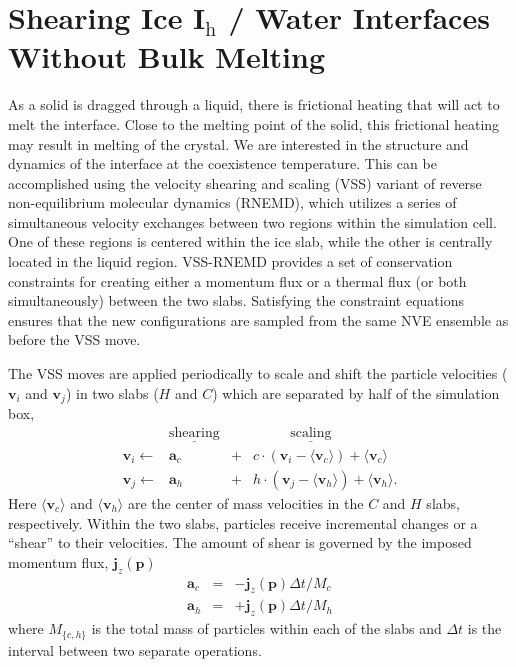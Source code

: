 \section{Shearing Ice I$_\mathrm{h}$ / Water Interfaces Without Bulk Melting}

As a solid is dragged through a liquid, there is frictional heating
that will act to melt the interface.  Close to the melting point of the
solid, this frictional heating may result in melting of the crystal.
We are interested in the structure and dynamics of the interface at
the coexistence temperature.  This can be accomplished using the velocity
shearing and scaling (VSS) variant of reverse non-equilibrium
molecular dynamics (RNEMD), which utilizes a series of simultaneous
velocity exchanges between two regions within the simulation
cell.\cite{Kuang2012} One of these regions is centered within the ice
slab, while the other is centrally located in the liquid
region. VSS-RNEMD provides a set of conservation constraints for
creating either a momentum flux or a thermal flux (or both
simultaneously) between the two slabs.  Satisfying the constraint
equations ensures that the new configurations are sampled from the
same NVE ensemble as before the VSS move.

The VSS moves are applied periodically to scale and shift the particle
velocities ($\mathbf{v}_i$ and $\mathbf{v}_j$) in two slabs ($H$ and
$C$) which are separated by half of the simulation box,
\begin{displaymath}
\begin{array}{rclcl}

 & \underline{\mathrm{shearing}} & &
 \underline{~~~~~~~~~~~~\mathrm{scaling}~~~~~~~~~~~~} \\
\mathbf{v}_i \leftarrow & 
  \mathbf{a}_c\ & + & c\cdot\left(\mathbf{v}_i - \langle\mathbf{v}_c
  \rangle\right)  +  \langle\mathbf{v}_c\rangle \\
\mathbf{v}_j \leftarrow & 
  \mathbf{a}_h & + & h\cdot\left(\mathbf{v}_j - \langle\mathbf{v}_h
    \rangle\right) + \langle\mathbf{v}_h\rangle .

\end{array}
\end{displaymath}
Here $\langle\mathbf{v}_c\rangle$ and $\langle\mathbf{v}_h\rangle$ are
the center of mass velocities in the $C$ and $H$ slabs, respectively.
Within the two slabs, particles receive incremental changes or a
``shear'' to their velocities.  The amount of shear is governed by the
imposed momentum flux, $\mathbf{j}_z(\mathbf{p})$
\begin{eqnarray}
\mathbf{a}_c & = & - \mathbf{j}_z(\mathbf{p}) \Delta t / M_c \label{vss1}\\
\mathbf{a}_h & = & + \mathbf{j}_z(\mathbf{p}) \Delta t / M_h \label{vss2}
\end{eqnarray}
where $M_{\{c,h\}}$ is the total mass of particles within each of the
slabs and $\Delta t$ is the interval between two separate operations.

